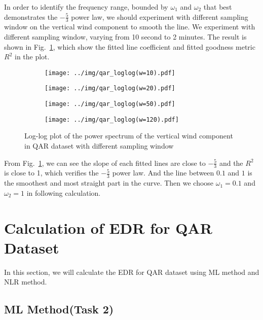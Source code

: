 \documentclass[runningheads]{llncs}
\begin{document}
In order to identify the frequency range, bounded by $\omega_1$ and $\omega_2$ that best demonstrates the $-\frac53$ power law,
we should experiment with different sampling window on the vertical wind component to smooth the line. 
We experiment with different sampling window, varying from 10 second to 2 minutes. 
The result is shown in Fig.~\ref{fig:1},
which show the fitted line coefficient and fitted goodness metric $R^2$ in the plot.
\begin{figure}[!htbp]
    \centering
    \begin{subfigure}{.4\textwidth}
        \centering
        \texttt{[image: ../img/qar\_loglog(w=10).pdf]}  
    \end{subfigure}
    \begin{subfigure}{.4\textwidth}
        \centering
        \texttt{[image: ../img/qar\_loglog(w=20).pdf]}  
    \end{subfigure}
    \begin{subfigure}{.4\textwidth}
        \centering
        \texttt{[image: ../img/qar\_loglog(w=50).pdf]}  
    \end{subfigure}
    \begin{subfigure}{.4\textwidth}
        \centering
        \texttt{[image: ../img/qar\_loglog(w=120).pdf]}  
    \end{subfigure}
    \caption{Log-log plot of the power spectrum of the vertical wind component in QAR dataset with different sampling window}
    \label{fig:1}
\end{figure}

From Fig.~\ref{fig:1}, we can see the slope of each fitted lines are close to $-\frac53$ and the $R^2$ is close to 1, which verifies the $-\frac53$ power law.
And the line between $0.1$ and $1$ is the smoothest and most straight part in the curve.
Then we choose $\omega_1=0.1$ and $\omega_2=1$ in following calculation.

\section{Calculation of EDR for QAR Dataset}

In this section, we will calculate the EDR for QAR dataset using ML method and NLR method.

\subsection{ML Method(Task 2)}
\end{document}
